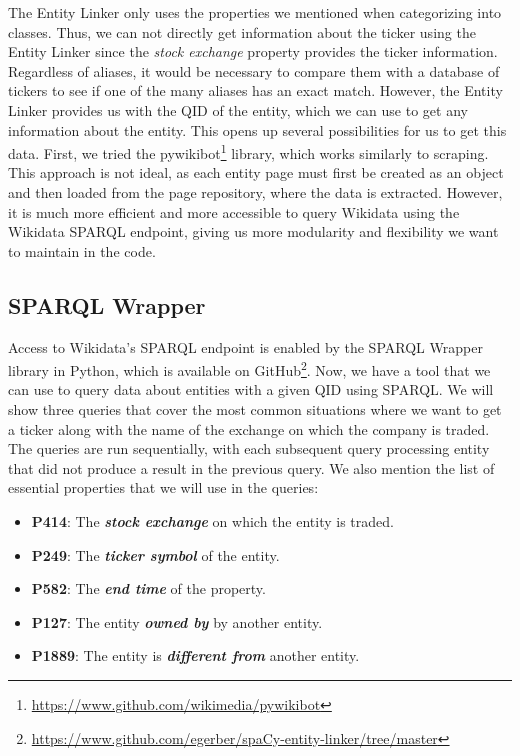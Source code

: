 The Entity Linker only uses the properties we mentioned when categorizing into classes. Thus, we can not directly get information about the ticker using the Entity Linker since the \textit{stock exchange} property provides the ticker information. Regardless of aliases, it would be necessary to compare them with a database of tickers to see if one of the many aliases has an exact match. However, the Entity Linker provides us with the QID of the entity, which we can use to get any information about the entity. This opens up several possibilities for us to get this data. First, we tried the pywikibot\footnote{\href{https://www.github.com/wikimedia/pywikibot}{https://www.github.com/wikimedia/pywikibot}} library, which works similarly to scraping. This approach is not ideal, as each entity page must first be created as an object and then loaded from the page repository, where the data is extracted. However, it is much more efficient and more accessible to query Wikidata using the Wikidata SPARQL endpoint, giving us more modularity and flexibility we want to maintain in the code.

\subsection{SPARQL Wrapper}
\label{subsubsec:sparql-wrapper}
Access to Wikidata's SPARQL endpoint is enabled by the SPARQL Wrapper library in Python, which is available on GitHub\footnote{\href{https://www.github.com/egerber/spaCy-entity-linker/tree/master}{https://www.github.com/egerber/spaCy-entity-linker/tree/master}}. Now, we have a tool that we can use to query data about entities with a given QID using SPARQL. We will show three queries that cover the most common situations where we want to get a ticker along with the name of the exchange on which the company is traded. The queries are run sequentially, with each subsequent query processing entity that did not produce a result in the previous query. We also mention the list of essential properties that we will use in the queries:

\begin{itemize}
    \item \textbf{P414}: The \textbf{\textit{stock exchange}} on which the entity is traded.
    \item \textbf{P249}: The \textbf{\textit{ticker symbol}} of the entity.
    \item \textbf{P582}: The \textbf{\textit{end time}} of the property.
    \item \textbf{P127}: The entity \textbf{\textit{owned by}} by another entity.
    \item \textbf{P1889}: The entity is \textbf{\textit{different from}} another entity.
\end{itemize}

